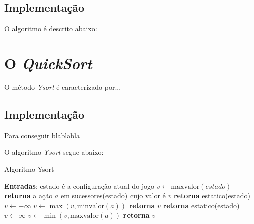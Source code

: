\documentclass[a4paper,10pt]{article} %
\begin{document}
\subsection{Implementação}

O algoritmo é descrito abaixo:

\section{O \textit{QuickSort}}

O método \emph{Ysort} é caracterizado por...


\subsection{Implementação}

Para conseguir blablabla

O algoritmo \textit{Ysort} segue abaixo:

\begin{algorithm}
\caption{Algoritmo Ysort}\label{alg:ysort}
\begin{algorithmic}[1]
\State \textbf{Entradas}: estado é a configuração atual do jogo
\State $v\gets \mathrm{maxvalor}{(estado)}$
\State \textbf{returna} a ação $a$ em sucessores(estado) cujo valor é $v$ %
\EndFunction
{}
   \State \textbf{retorna} estatico(estado)
\EndIf
\State $v \gets -\infty$
    \State $v \gets \max{(v, \mathrm{minvalor}(a))}$
\EndFor
\State \textbf{retorna} $v$
\EndFunction
{}
   \State \textbf{retorna} estatico(estado)
\EndIf
\State $v \gets \infty$
    \State $v \gets \min{(v, \mathrm{maxvalor}(a))}$
\EndFor
\State \textbf{retorna} $v$
\EndFunction
\end{algorithmic}
\end{algorithm}

\end{document}
